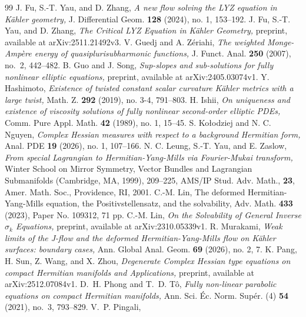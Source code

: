 \documentclass{amsart}
\numberwithin{equation}{section}
\theoremstyle{plain}
\theoremstyle{definition}
\theoremstyle{remark}
\begin{document}
\begin{thebibliography}{99}
  J. Fu, S.-T. Yau, and D. Zhang, 
  \textit{A new flow solving the LYZ equation in Kähler geometry,} 
  J. Differential Geom. \textbf{128} (2024), no. 1, 153--192.
  J. Fu, S.-T. Yau, and D. Zhang,
  \textit{The Critical LYZ Equation in Kähler Geometry,}
  preprint, available at arXiv:2511.21492v3.
  V. Guedj and A. Z\'eriahi, 
  \textit{The weighted Monge-Amp\`ere energy of quasiplurisubharmonic functions,} J. Funct. Anal. {\bf 250} (2007), no.~2, 442--482.
  B. Guo and J. Song,
  \textit{Sup-slopes and sub-solutions for fully nonlinear elliptic equations,}
  preprint, available at arXiv:2405.03074v1.
  Y. Hashimoto,
  \textit{Existence of twisted constant scalar curvature K{\"a}hler metrics with a large twist,}
  Math. Z. \textbf{292} (2019), no. 3-4, 791--803.
  H. Ishii, 
  \textit{On uniqueness and existence of viscosity solutions of fully nonlinear second-order elliptic PDEs,} 
  Comm. Pure Appl. Math. \textbf{42} (1989), no. 1, 15--45.
  S. Kołodziej and N. C. Nguyen, 
  \textit{Complex Hessian measures with respect to a background Hermitian form,} Anal. PDE \textbf{19} (2026), no. 1, 107--166.
  N. C. Leung, S.-T. Yau, and E. Zaslow, 
  \textit{From special Lagrangian to Hermitian-Yang-Mills via Fourier-Mukai transform,} 
  Winter School on Mirror Symmetry, Vector Bundles and Lagrangian Submanifolds (Cambridge, MA, 1999), 209--225, AMS/IP Stud. Adv. Math., \textbf{23}, Amer. Math. Soc., Providence, RI, 2001.
  C.-M. Lin, The deformed Hermitian-Yang-Mills equation, the Positivstellensatz, and the solvability, Adv. Math. {\bf 433} (2023), Paper No. 109312, 71 pp.
  C.-M. Lin,
  \textit{On the Solvability of General Inverse $\sigma_k$ Equations,}
  preprint, available at arXiv:2310.05339v1.
  R. Murakami,
  \textit{Weak limits of the J-flow and the deformed Hermitian-Yang-Mills flow on Kähler surfaces: boundary cases,} 
  Ann. Global Anal. Geom. \textbf{69} (2026), no. 2, 7.
  K. Pang, H. Sun, Z. Wang, and X. Zhou,
  \textit{Degenerate Complex Hessian type equations on compact Hermitian manifolds and Applications,}
  preprint, available at arXiv:2512.07084v1.
  D.~H. Phong and T.~D. T\^o, 
  \textit{Fully non-linear parabolic equations on compact Hermitian manifolds,} Ann. Sci. \'Ec. Norm. Sup\'er. (4) {\bf 54} (2021), no.~3, 793--829.
  V.~P. Pingali, 

\end{thebibliography}
\end{document}
